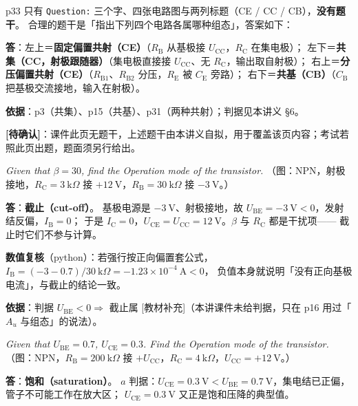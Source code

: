\documentclass[11pt]{ctexart}
\begin{document}

p33 只有 \texttt{Question:} 三个字、四张电路图与两列标题（CE / CC / CB），\textbf{没有题干}。
合理的题干是「指出下列四个电路各属哪种组态」，答案如下：

\textbf{答}：左上＝\textbf{固定偏置共射（CE）}（$R_{\mathrm{B}}$ 从基极接 $U_{\mathrm{CC}}$，$R_{\mathrm{C}}$ 在集电极）；
左下＝\textbf{共集（CC，射极跟随器）}（集电极直接接 $U_{\mathrm{CC}}$、无 $R_{\mathrm{C}}$，输出取自射极）；
右上＝\textbf{分压偏置共射（CE）}（$R_{\mathrm{B1}}$、$R_{\mathrm{B2}}$ 分压，$R_{\mathrm{E}}$ 被 $C_{\mathrm{E}}$ 旁路）；
右下＝\textbf{共基（CB）}（$C_{\mathrm{B}}$ 把基极交流接地，输入在射极）。

\textbf{依据}：p3（共集）、p15（共基）、p31（两种共射）；判据见本讲义 §6。

\textbf{[待确认]}：课件此页无题干，上述题干由本讲义自拟，用于覆盖该页内容；考试若照此页出题，题面须另行给出。


\textit{Given that $\beta=30$, find the Operation mode of the transistor.}
（图：NPN，射极接地，$R_{\mathrm{C}}=3\ \mathrm{k}\Omega$ 接 $+12\ \mathrm{V}$，$R_{\mathrm{B}}=30\ \mathrm{k}\Omega$ 接 $-3\ \mathrm{V}$。）

\textbf{答}：\textbf{截止（cut-off）}。
基极电源是 $-3\ \mathrm{V}$、射极接地，故 $U_{\mathrm{BE}}=-3\ \mathrm{V}<0$，发射结反偏，$I_{\mathrm{B}}=0$；
于是 $I_{\mathrm{C}}=0$，$U_{\mathrm{CE}}=U_{\mathrm{CC}}=12\ \mathrm{V}$。$\beta$ 与 $R_{\mathrm{C}}$ 都是干扰项——
截止时它们不参与计算。

\textbf{数值复核}（python）：若强行按正向偏置套公式，
$I_{\mathrm{B}}=(-3-0.7)/30\ \mathrm{k}\Omega=-1.23\times10^{-4}\ \mathrm{A}<0$，
负值本身就说明「没有正向基极电流」，与截止的结论一致。

\textbf{依据}：判据 $U_{\mathrm{BE}}<0\Rightarrow$ 截止属 [教材补充]（本讲课件未给判据，只在 p16 用过「$A_u$ 与组态」的说法）。


\textit{Given that $U_{\mathrm{BE}}=0.7$, $U_{\mathrm{CE}}=0.3$. Find the Operation mode of the transistor.}
（图：NPN，$R_{\mathrm{B}}=200\ \mathrm{k}\Omega$ 接 $+U_{\mathrm{CC}}$，$R_{\mathrm{C}}=4\ \mathrm{k}\Omega$，$U_{\mathrm{CC}}=+12\ \mathrm{V}$。）

\textbf{答}：\textbf{饱和（saturation）}。
$a$ 判据：$U_{\mathrm{CE}}=0.3\ \mathrm{V}<U_{\mathrm{BE}}=0.7\ \mathrm{V}$，集电结已正偏，管子不可能工作在放大区；
$U_{\mathrm{CE}}=0.3\ \mathrm{V}$ 又正是饱和压降的典型值。
\end{document}

